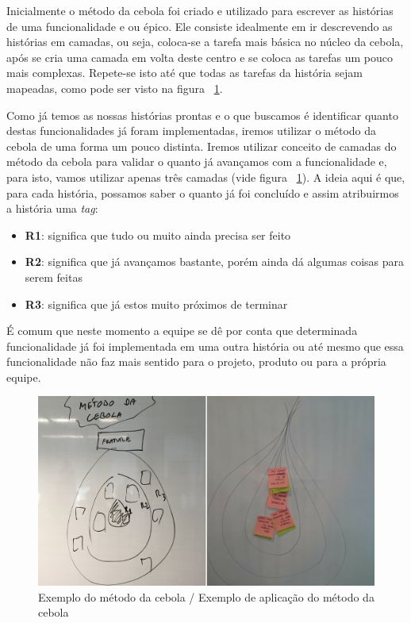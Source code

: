 \documentclass[10pt]{article}
\begin{document}
            Inicialmente o método da cebola foi criado e utilizado para escrever as histórias de uma funcionalidade e ou épico. Ele consiste idealmente em ir descrevendo as histórias em camadas, ou seja, coloca-se a tarefa mais básica no núcleo da cebola, após se cria uma camada em volta deste centro e se coloca as tarefas um pouco mais complexas. Repete-se isto até que todas as tarefas da história sejam mapeadas, como pode ser visto na figura ~\ref{figura:3}. 
            
            Como já temos as nossas histórias prontas e o que buscamos é identificar quanto destas funcionalidades já foram implementadas, iremos utilizar o método da cebola de uma forma um pouco distinta. Iremos utilizar conceito de camadas do método da cebola para validar o quanto já avançamos com a funcionalidade e, para isto, vamos utilizar apenas três camadas (vide figura ~\ref{figura:3}). A ideia aqui é que, para cada história, possamos saber o quanto já foi concluído e assim atribuirmos a história uma \textit{tag}:
            \begin{itemize}
                \item \textbf{R1}: significa que tudo ou muito ainda precisa ser feito
                \item \textbf{R2}: significa que já avançamos bastante, porém ainda dá algumas coisas para serem feitas
                \item \textbf{R3}: significa que já estos muito próximos de terminar
            \end{itemize}
            
            É comum que neste momento a equipe se dê por conta que determinada funcionalidade já foi implementada em uma outra história ou até mesmo que essa funcionalidade não faz mais sentido para o projeto, produto ou para a própria equipe.
            
            \begin{figure}[H]
        		\centering
        		\includegraphics[width=.7\textwidth]{images/como-cebola.png}
        		\caption{ Exemplo do método da cebola / Exemplo de aplicação do método da cebola}
        		\label{figura:3}
        	\end{figure}
        
\end{document}
